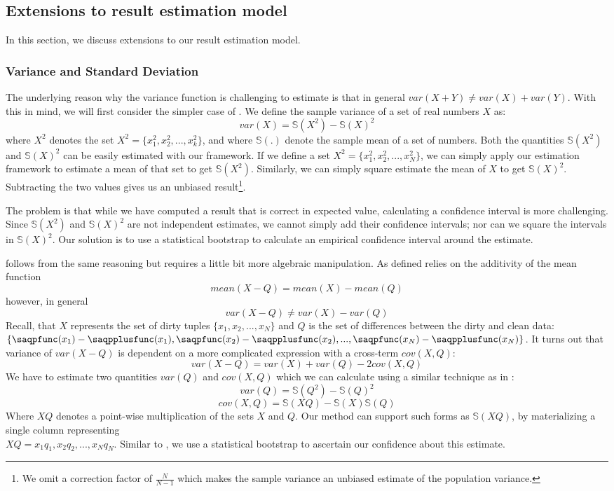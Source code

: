 \subsection{Extensions to result estimation model}\label{app:ext}
In this section, we discuss extensions to our result estimation model.

\subsubsection{Variance and Standard Deviation}
The underlying reason why the variance function is challenging to estimate is that in general $var(X+Y) \ne var(X)+var(Y)$.
With this in mind, we will first consider the simpler case of \sampleclean.
We define the sample variance of a set of real numbers $X$ as:
\[ var(X) = \mathbb{S}(X^2)-\mathbb{S}(X)^2 \]
where $X^2$ denotes the set $X^2=\{x_1^2,x_2^2,...,x_k^2\}$, and where $\mathbb{S}(.)$ denote the sample mean of a set of numbers.
Both the quantities $\mathbb{S}(X^2)$ and $\mathbb{S}(X)^2$ can be easily estimated with our framework.
If we define a set $X^2=\{x_1^2,x_2^2,...,x_N^2\}$, we can simply apply our estimation framework to estimate a mean of that set to get $\mathbb{S}(X^2)$.
Similarly, we can simply square estimate the mean of $X$ to get $\mathbb{S}(X)^2$.
Subtracting the two values gives us an unbiased result\footnote{We omit a correction factor of $\frac{N}{N-1}$ which makes the sample variance an unbiased estimate of the population variance.}.

The problem is that while we have computed a result that is correct in expected value, calculating a confidence interval is more challenging.
Since $\mathbb{S}(X^2)$ and $\mathbb{S}(X)^2$ are not independent estimates, we cannot simply add their confidence intervals; nor can we square the intervals in $\mathbb{S}(X)^2$.
Our solution is to use a statistical bootstrap to calculate an empirical confidence interval around the estimate.

\bias follows from the same reasoning but requires a little bit more algebraic manipulation.
As defined \bias relies on the additivity of the mean function \[mean(X-Q)=mean(X)-mean(Q)\] however, in general \[var(X-Q)\ne var(X) - var(Q)\]
Recall, that $X$ represents the set of dirty tuples $\{x_1,x_2,...,x_N\}$ and $Q$ is the set of
differences between the dirty and clean data: \\$\{\saqpfunc(x_1)-\saqpplusfunc(x_1),\saqpfunc(x_2)-\saqpplusfunc(x_2),...,\saqpfunc(x_N)-\saqpplusfunc(x_N)\}$.
It turns out that variance of $var(X-Q)$ is dependent on a more complicated expression with a cross-term $cov(X,Q)$:
\[ var(X-Q) = var(X)+var(Q)-2cov(X,Q) \]
We have to estimate two quantities $var(Q)$ and $cov(X,Q)$ which we can calculate using a similar technique as in \sampleclean:
\[ var(Q) = \mathbb{S}(Q^2)-\mathbb{S}(Q)^2 \]
\[ cov(X,Q) = \mathbb{S}(XQ)-\mathbb{S}(X)\mathbb{S}(Q) \]
Where $XQ$ denotes a point-wise multiplication of the sets $X$ and $Q$.
Our method can support such forms as $\mathbb{S}(XQ)$, by materializing a single column representing \\$XQ={x_1q_1,x_2q_2,...,x_Nq_N}$.
Similar to \sampleclean, we use a statistical bootstrap to ascertain our confidence about this estimate. 

